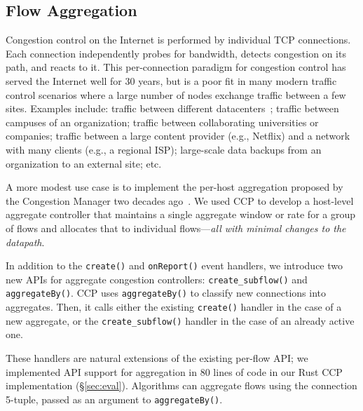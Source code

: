 \subsection{Flow Aggregation}
\label{s:capabilities:agg}

Congestion control on the Internet is performed by individual TCP connections. Each connection independently probes for bandwidth, detects congestion on its path, and reacts to it. 
This per-connection paradigm for congestion control has served the Internet well for 30 years, but is a poor fit in many modern traffic control scenarios where a large number of nodes exchange traffic between a few sites. 
Examples include: traffic between different datacenters~\cite{b4, swan}; traffic between campuses of an organization; traffic between collaborating universities or companies; traffic between a large content provider (e.g., Netflix) and a network with many clients (e.g., a regional ISP); large-scale data backups from an organization to an external site; etc. 

A more modest use case is to implement the per-host aggregation proposed by the Congestion Manager two decades ago~\cite{cm}. We used CCP to develop a host-level aggregate controller that maintains a single aggregate window or rate for a group of flows and allocates that to individual flows---{\em all with minimal changes to the datapath}.

%

 In addition to the \texttt{create()} and \texttt{onReport()} event handlers, we introduce two new APIs for aggregate congestion controllers: \texttt{create\_subflow()} and \texttt{aggregateBy()}. 
CCP uses \texttt{aggregateBy()} to classify new connections into aggregates. Then, it calls either the existing \texttt{create()} handler in the case of a new aggregate, or the \texttt{create\_subflow()} handler in the case of an already active one.

These handlers are natural extensions of the existing per-flow API; we implemented API support for aggregation in $80$ lines of code in our Rust CCP implementation (\S\ref{sec:eval}).
Algorithms can aggregate flows using the connection 5-tuple, passed as an argument to \texttt{aggregateBy()}.

